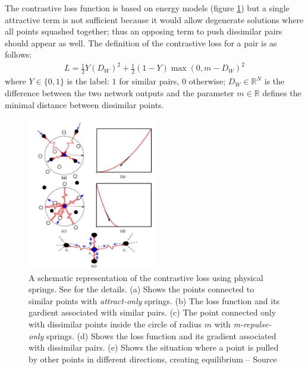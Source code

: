 \documentclass[a4paper,12pt]{report}
\newcommand{\R}{\mathbb{R}}
\begin{document}
The contrastive loss function is based on energy models (figure \ref{fig:contrastive_spring}) but a single attractive term is not sufficient because it would allow degenerate solutions where all points squashed together; thus an opposing term to push dissimilar pairs should appear as well.
The definition of the contrastive loss for a pair is as follows:
\begin{eqnarray}
    L = \frac{1}{2} Y (D_W)^2 + \frac{1}{2} (1-Y) \max(0, m - D_W)^2
\end{eqnarray}
where $Y \in \{0,1\}$ is the label: $1$ for similar pairs, $0$ otherwise; $D_W \in \R^N$ is the difference between the two network outputs and the parameter $m \in \R$ defines the minimal distance between dissimilar points.

\begin{figure}[t]
    \begin{center}
        \includegraphics[width=0.5\textwidth]{thesis_figures/contrastive_spring.jpg}
    \end{center}
    \caption{A schematic representation of the contrastive loss using physical springs. See \cite{hadsell2006dimensionality} for the details. (a) Shows the points connected to similar points with {\em attract-only} springs. (b) The loss function and its gardient associated with similar pairs. (c) The point connected only with dissimilar points inside the circle of radius $m$ with {\em m-repulse-only} springs. (d) Shows the loss function and its gradient associated with dissimilar pairs. (e) Shows the situation where a point is pulled by other points in different directions, creating equilibrium -- Source \cite{hadsell2006dimensionality}}
    \label{fig:contrastive_spring}
\end{figure}
\end{document}
